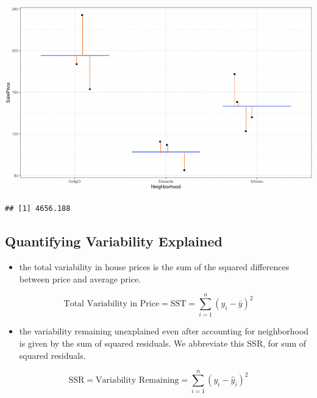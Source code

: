 \documentclass[]{book}
\newenvironment{Shaded}{\begin{snugshade}}{\end{snugshade}}
\newcommand{\KeywordTok}[1]{\textcolor[rgb]{0.13,0.29,0.53}{\textbf{#1}}}
\newcommand{\DecValTok}[1]{\textcolor[rgb]{0.00,0.00,0.81}{#1}}
\newcommand{\OperatorTok}[1]{\textcolor[rgb]{0.81,0.36,0.00}{\textbf{#1}}}
\newcommand{\NormalTok}[1]{#1}
\providecommand{\tightlist}{%
  \setlength{\itemsep}{0pt}\setlength{\parskip}{0pt}}
\begin{document}
\includegraphics[width=13.53in]{Cat_Resid}

\begin{Shaded}
\end{Shaded}

\begin{verbatim}
## [1] 4656.188
\end{verbatim}

\subsection{Quantifying Variability
Explained}\label{quantifying-variability-explained}

\begin{itemize}
\tightlist
\item
  the total variability in house prices is the sum of the squared
  differences between price and average price.
\end{itemize}

\[\text{Total Variability in Price}= \text{SST} =\displaystyle\sum_{i=1}^n(y_i-\bar{y})^2\]

\begin{itemize}
\tightlist
\item
  the variability remaining unexplained even after accounting for
  neighborhood is given by the sum of squared residuals. We abbreviate
  this SSR, for sum of squared residuals.
\end{itemize}

\[
\text{SSR} = \text{Variability Remaining}=\displaystyle\sum_{i=1}^n(y_i-\hat{y}_i)^2
\]
\end{document}
